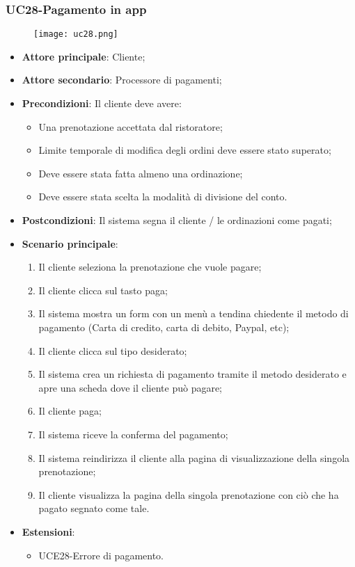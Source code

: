 \subsubsection{UC28-Pagamento in app}
\begin{figure}[h] \texttt{[image: uc28.png]} \end{figure}

\begin{itemize}
\item \textbf{Attore principale}: Cliente;
\item \textbf{Attore secondario}: Processore di pagamenti;
\item \textbf{Precondizioni}: Il cliente deve avere:
\begin{itemize}
\item Una prenotazione accettata dal ristoratore;
\item Limite temporale di modifica degli ordini deve essere stato superato;
\item Deve essere stata fatta almeno una ordinazione;
\item Deve essere stata scelta la modalità di divisione del conto.
\end{itemize}
\item \textbf{Postcondizioni}: Il sistema segna il cliente / le ordinazioni come pagati;
\item \textbf{Scenario principale}:
\begin{enumerate}
\item Il cliente seleziona la prenotazione che vuole pagare;
\item Il cliente clicca sul tasto paga;
\item Il sistema mostra un form con un menù a tendina chiedente il metodo di pagamento (Carta di credito, carta di debito, Paypal, etc);
\item Il cliente clicca sul tipo desiderato;
\item Il sistema crea un richiesta di pagamento tramite il metodo desiderato e apre una scheda dove il cliente può pagare;
\item Il cliente paga;
\item Il sistema riceve la conferma del pagamento;
\item Il sistema reindirizza il cliente alla pagina di visualizzazione della singola prenotazione;
\item Il cliente visualizza la pagina della singola prenotazione con ciò che ha pagato segnato come tale.
\end{enumerate}
\item \textbf{Estensioni}:
\begin{itemize}
\item UCE28-Errore di pagamento.
\end{itemize}
\end{itemize}

